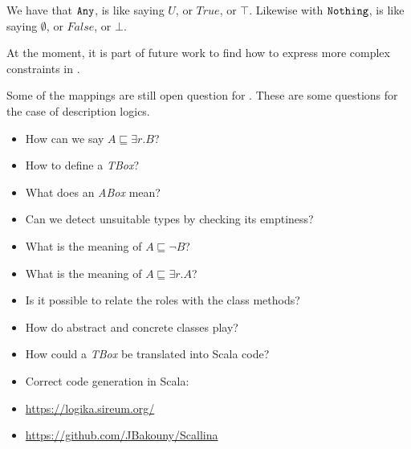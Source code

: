 We have that $\texttt{{Any}}$, is like saying $U$, or $True$, or $\top$.
Likewise with $\texttt{{Nothing}}$, is like saying $\emptyset$, or $False$, or $\bot$.

At the moment, it is part of future work to find how to express more complex constraints in \Soda.

Some of the mappings are still open question for \Soda.
These are some questions for the case of description logics.

\begin{itemize}
    \item How can we say $A \sqsubseteq \exists r. B $?
    \item How to define a \textit{TBox}?
    \item What does an \textit{ABox} mean?
    \item Can we detect unsuitable types by checking its emptiness?
    \item What is the meaning of $A \sqsubseteq \lnot B$?
    \item What is the meaning of $A \sqsubseteq \exists r. A$?
    \item Is it possible to relate the roles with the class methods?
    \item How do abstract and concrete classes play?
    \item How could a \textit{TBox} be translated into Scala code?
\end{itemize}

\begin{itemize}
    \item Correct code generation in Scala:
    \item \url{https://logika.sireum.org/}
    \item \url{https://github.com/JBakouny/Scallina}
\end{itemize}

